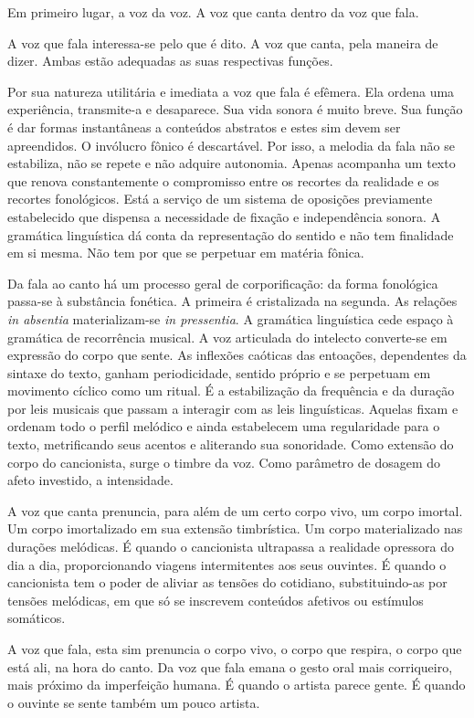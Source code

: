 Em primeiro lugar, a voz da voz. A voz que canta dentro da voz que fala.

A voz que fala interessa-se pelo que é dito. A voz que canta, pela
maneira de dizer. Ambas estão adequadas as suas respectivas funções.

Por sua natureza utilitária e imediata a voz que fala é efêmera. Ela
ordena uma experiência, transmite-a e desaparece. Sua vida sonora é
muito breve. Sua função é dar formas instantâneas a conteúdos abstratos
e estes sim devem ser apreendidos. O invólucro fônico é descartável. Por
isso, a melodia da fala não se estabiliza, não se repete e não adquire
autonomia. Apenas acompanha um texto que renova constantemente o
compromisso entre os recortes da realidade e os recortes fonológicos.
Está a serviço de um sistema de oposições previamente estabelecido que
dispensa a necessidade de fixação e independência sonora. A gramática
linguística dá conta da representação do sentido e não tem finalidade em
si mesma. Não tem por que se perpetuar em matéria fônica.

Da fala ao canto há um processo geral de corporificação: da forma
fonológica passa-se à substância fonética. A primeira é cristalizada na
segunda. As relações \textit{in absentia} materializam-se \textit{in pressentia}. A
gramática linguística cede espaço à gramática de recorrência musical. A
voz articulada do intelecto converte-se em expressão do corpo que sente.
As inflexões caóticas das entoações, dependentes da sintaxe do texto,
ganham periodicidade, sentido próprio e se perpetuam em movimento
cíclico como um ritual. É a estabilização da frequência e da duração por
leis musicais que passam a interagir com as leis linguísticas. Aquelas
fixam e ordenam todo o perfil melódico e ainda estabelecem uma
regularidade para o texto, metrificando seus acentos e aliterando sua
sonoridade. Como extensão do corpo do cancionista, surge o timbre da
voz. Como parâmetro de dosagem do afeto investido, a intensidade.

A voz que canta prenuncia, para além de um certo corpo vivo, um corpo
imortal. Um corpo imortalizado em sua extensão timbrística. Um corpo
materializado nas durações melódicas. É quando o cancionista ultrapassa
a realidade opressora do dia a dia, proporcionando viagens intermitentes
aos seus ouvintes. É quando o cancionista tem o poder de aliviar as
tensões do cotidiano, substituindo-as por tensões melódicas, em que só
se inscrevem conteúdos afetivos ou estímulos somáticos.

A voz que fala, esta sim prenuncia o corpo vivo, o corpo que respira, o
corpo que está ali, na hora do canto. Da voz que fala emana o gesto oral
mais corriqueiro, mais próximo da imperfeição humana. É quando o artista
parece gente. É quando o ouvinte se sente também um pouco artista.

